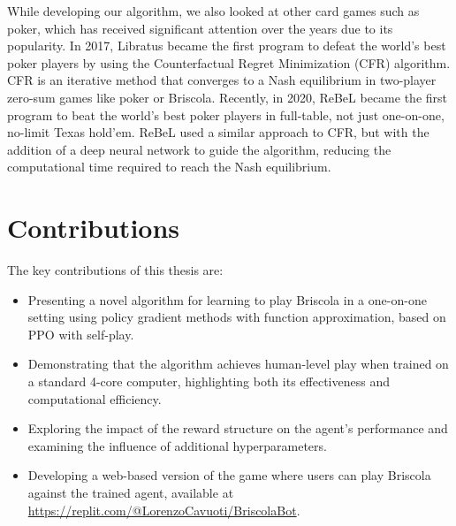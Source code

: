While developing our algorithm, we also looked at other card games such as poker, which has received significant attention over the years due to its popularity. In 2017, Libratus \cite{libratus} became the first program to defeat the world's best poker players by using the Counterfactual Regret Minimization (CFR) \cite{cfr} algorithm. CFR is an iterative method that converges to a Nash equilibrium in two-player zero-sum games like poker or Briscola. Recently, in 2020, ReBeL \cite{rebel} became the first program to beat the world's best poker players in full-table, not just one-on-one, no-limit Texas hold'em. ReBeL used a similar approach to CFR, but with the addition of a deep neural network to guide the algorithm, reducing the computational time required to reach the Nash equilibrium.

\section{Contributions}
The key contributions of this thesis are:
\begin{itemize}
    \item Presenting a novel algorithm for learning to play Briscola in a one-on-one setting using policy gradient methods with function approximation, based on PPO with self-play.
    \item Demonstrating that the algorithm achieves human-level play when trained on a standard 4-core computer, highlighting both its effectiveness and computational efficiency.
    \item Exploring the impact of the reward structure on the agent's performance and examining the influence of additional hyperparameters.
    \item Developing a web-based version of the game where users can play Briscola against the trained agent, available at \url{https://replit.com/@LorenzoCavuoti/BriscolaBot}.
\end{itemize}

